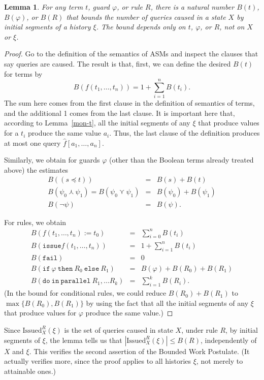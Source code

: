\documentclass{LMCS}
\newtheorem{la}[thm]{Lemma}
\theoremstyle{definition}
\newenvironment{eqs}{\begin{eqnarray*}}{\end{eqnarray*}}
\newcommand{\Issued}{\text{Issued}}
\newcommand{\kand}{\curlywedge}
\newcommand{\kor}{\curlyvee}
\newcommand{\ttt}[1]{\ensuremath{\mathtt {#1}}}
\renewcommand{\phi}{\varphi}
\begin{document}
\begin{la}
For any term $t$, guard $\phi$, or rule $R$, there is a natural number
$B(t)$, $B(\phi)$, or $B(R)$ that bounds the number of queries caused
in a state $X$ by initial segments of a history $\xi$.  The bound
depends only on $t$, $\phi$, or $R$, not on $X$ or $\xi$.
\end{la}

\begin{proof}
Go to the definition of the semantics of ASMs and inspect the clauses
that say queries are caused.  The result is that, first, we can define
the desired $B(t)$ for terms by
$$
B(f(t_1,\dots,t_n))=1+\sum_{i=1}^nB(t_i).
$$
The sum here comes from the first clause in the definition of
semantics of terms, and the additional 1 comes from the last clause.
It is important here that, according to Lemma~\ref{mon-t}, all the
initial segments of any $\xi$ that produce values for a $t_i$ produce
the same value $a_i$.  Thus, the last clause of the definition
produces at most one query $\hat f[a_1,\dots,a_n]$.

Similarly, we obtain for guards $\phi$ (other than the Boolean terms
already treated above) the estimates
\begin{eqs}
B((s\preceq t))&=&B(s)+B(t)\\
B(\psi_0\kand\psi_1)=B(\psi_0\kor\psi_1)&=&B(\psi_0)+B(\psi_1)\\
B(\neg\psi)&=&B(\psi).
\end{eqs}

For rules, we obtain
\begin{eqs}
B(f(t_1,\dots,t_n):=t_0)&=&\sum_{i=0}^nB(t_i)\\
B(\ttt{issue}f(t_1,\dots,t_n))&=&1+\sum_{i=1}^nB(t_i)\\
B(\ttt{fail})&=&0\\
B(\ttt{if\ }\phi\ttt{\ then\ }R_0\ttt{\ else\ }R_1)&=&
B(\phi)+B(R_0)+B(R_1)\\
B(\ttt{do\ in\ parallel\ }R_1,\dots R_k)&=&
\sum_{i=1}^kB(R_i).
\end{eqs}(In the bound for conditional rules, we could reduce $B(R_0)+B(R_1)$
to $\max\{B(R_0),B(R_1)\}$ by using the fact that all the initial
segments of any $\xi$ that produce values for $\phi$ produce
the same value.)
\end{proof}

Since $\Issued^R_X(\xi)$ is the set of queries caused in state $X$,
under rule $R$, by initial segments of $\xi$, the lemma tells us that
$|\Issued^R_X(\xi)|\leq B(R)$, independently of $X$ and $\xi$.  This
verifies the second assertion of the Bounded Work Postulate.  (It
actually verifies more, since the proof applies to all histories
$\xi$, not merely to attainable ones.)
\end{document}
